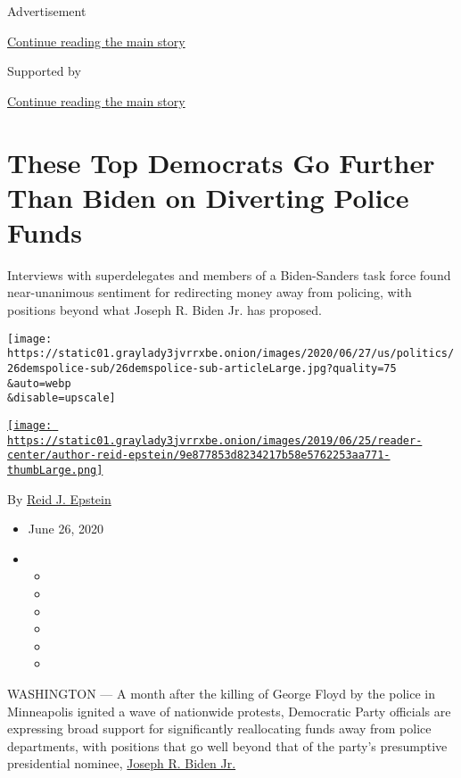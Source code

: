 Advertisement

\protect\hyperlink{after-top}{Continue reading the main story}

Supported by

\protect\hyperlink{after-sponsor}{Continue reading the main story}

\hypertarget{these-top-democrats-go-further-than-biden-on-diverting-police-funds}{%
\section{These Top Democrats Go Further Than Biden on Diverting Police
Funds}\label{these-top-democrats-go-further-than-biden-on-diverting-police-funds}}

Interviews with superdelegates and members of a Biden-Sanders task force
found near-unanimous sentiment for redirecting money away from policing,
with positions beyond what Joseph R. Biden Jr. has proposed.

\texttt{[image: https://static01.graylady3jvrrxbe.onion/images/2020/06/27/us/politics/26demspolice-sub/26demspolice-sub-articleLarge.jpg?quality=75\\\&auto=webp\\\&disable=upscale]}

\href{https://www.nytimes3xbfgragh.onion/by/reid-j-epstein}{\texttt{[image: https://static01.graylady3jvrrxbe.onion/images/2019/06/25/reader-center/author-reid-epstein/9e877853d8234217b58e5762253aa771-thumbLarge.png]}}

By \href{https://www.nytimes3xbfgragh.onion/by/reid-j-epstein}{Reid J.
Epstein}

\begin{itemize}
\item
  June 26, 2020
\item
  \begin{itemize}
  \item
  \item
  \item
  \item
  \item
  \item
  \end{itemize}
\end{itemize}

WASHINGTON --- A month after the killing of George Floyd by the police
in Minneapolis ignited a wave of nationwide protests, Democratic Party
officials are expressing broad support for significantly reallocating
funds away from police departments, with positions that go well beyond
that of the party's presumptive presidential nominee,
\href{https://www.nytimes3xbfgragh.onion/interactive/2020/us/elections/joe-biden.html}{Joseph
R. Biden Jr.}

